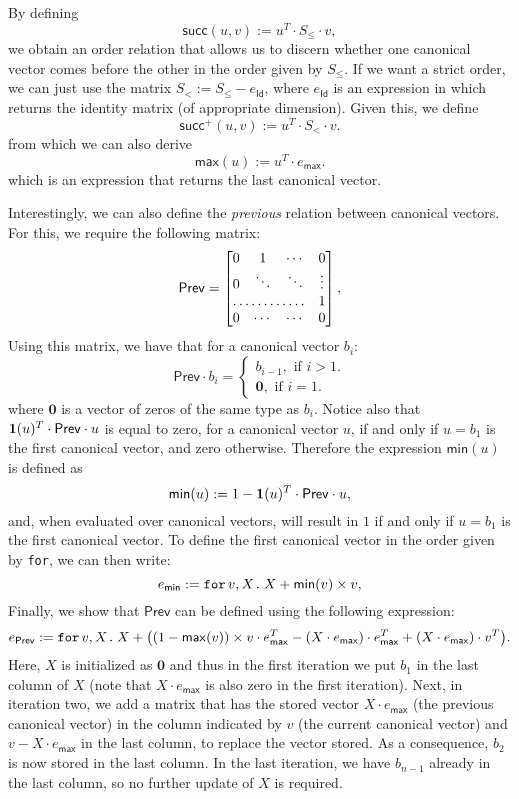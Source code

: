By defining 
$$
\mathsf{succ}(u,v) := u^T\cdot S_{\leq} \cdot v,
$$
we obtain an order relation that allows us to discern whether one canonical vector comes before 
the other in the order given by $S_{\leq}$. If we want a strict order, we can just use the matrix
$S_< := S_{\leq} - e_{\mathsf{Id}}$, where $e_{\mathsf{Id}}$ is an expression in \langfor which returns the identity matrix (of appropriate dimension). Given this, we define
$$\mathsf{succ}^+(u,v) := u^T\cdot S_{<} \cdot v.$$
from which we can also derive 
$$
\mathsf{max}(u):=u^T\cdot e_{\mathsf{max}}.
$$
which is an expression that returns the last canonical vector.

Interestingly, we can also define the \textit{previous} relation between canonical vectors. 
For this, we require the following matrix:
\[
\mathsf{Prev} = \begin{bmatrix}
    0 & 1 & \cdots &  0 \\
    0 & \ddots & \ddots & \vdots \\
    \hdotsfor{3} & 1 \\
    0 & \cdots & \cdots & 0
\end{bmatrix},
\]
Using this matrix, we have that for a canonical vector $b_i$:
\[
\mathsf{Prev}\cdot b_i=\begin{cases}
               b_{i-1}, \text{ if } i > 1. \\
              \mathbf{0}, \text{ if } i = 1.
            \end{cases}
\]
where $\mathbf{0}$ is a vector of zeros of the same type as $b_i$. Notice also that $\mathbf{1}(u)^T\cdot \mathsf{Prev} \cdot u$ is equal to zero, for a canonical vector $u$, if and only if $u = b_1$ is the first canonical vector, and zero otherwise.
Therefore the expression $\mathsf{min}(u)$ is defined as $$\mathsf{min}(u) := 1 - \mathbf{1}(u)^T\cdot \mathsf{Prev} \cdot u,$$ and, when evaluated over canonical vectors, will result in $1$ if and only if $u=b_1$ is the first canonical vector.
To define the first canonical vector in the order given by \texttt{for}, we can then write:
$$e_{\mathsf{min}} := \texttt{for}\, v,X \texttt{.}\, X + \mathsf{min}(v)\times v,$$
Finally, we show that $\mathsf{Prev}$ can be defined using the following \langfor expression:
$$e_{\mathsf{Prev}}:= \texttt{for}\, v,X \texttt{.}\, X + \bigl((1 - \mathsf{max}(v))\times v\cdot e_{\mathsf{max}}^T - (X\cdot e_{\mathsf{max}})\cdot e_{\mathsf{max}}^T + (X\cdot e_{\mathsf{max}})\cdot v^T\bigr).$$
Here, $X$ is initialized as $\mathbf{0}$ and thus in the first iteration we put
 $b_1$ in the last column of $X$ (note that $X\cdot e_{\mathsf{max}}$ is also zero in the first iteration). Next, in iteration two, we add a matrix that has the stored vector $X\cdot e_{\mathsf{max}}$ (the previous canonical vector) in the column indicated by $v$ (the current canonical vector) and $v-X\cdot e_{\mathsf{max}}$ in the last column, to replace the vector stored. As a consequence, $b_2$ is now stored in the last column. In the last iteration, we have $b_{n-1}$ already in the last column, so no further update of $X$ is required.
 
